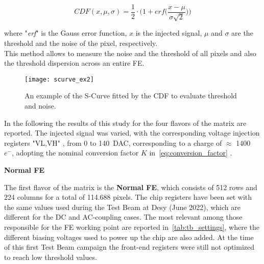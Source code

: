 \begin{equation}
 CDF(x,\mu,\sigma) = \frac{1}{2} \cdot \bigg(1 + \textit{erf}\bigg(\frac{x-\mu}{\sigma \sqrt{2}}\bigg)\bigg)
\label{eq:s-curve}
\end{equation}

where "\textit{erf}" is the Gauss error function, $x$ is the injected signal, $\mu$ and $\sigma$ are the threshold and the noise of the pixel, respectively.  \\

This method allows to measure the noise and the threshold of all pixels and also the threshold dispersion across an entire FE.

\begin{figure}
\centering
\texttt{[image: scurve\_ex2]}
\caption{An example of the S-Curve fitted by the CDF to evaluate threshold and noise.}
\label{fig:ex_scurve}
\end{figure}

In the following the results of this study for the four flavors of the matrix are reported. The injected signal was varied, with the corresponding voltage injection registers "VL,VH" , from 0 to \SI{140}{DAC}, corresponding to a charge of $\approx$ 1400~$e^{-}$, adopting the nominal conversion factor $K$ in~\autoref{eq:conversion_factor} .





\medskip
\begin{description}
\item \textbf{Normal FE}
\end{description}

The first flavor of the matrix is the \textbf{Normal FE}, which consists of 512 rows and 224 columns for a total of 114.688 pixels. The chip registers have been set with the same values used during the Test Beam at Desy (June 2022), which are different for the DC and AC-coupling cases. The most relevant among those responsible for the FE working point are reported in~\autoref{tab:tb_settings}, where the different biasing voltages used to power up the chip are also added. At the time of this first Test Beam campaign the front-end registers were still not  optimized to reach low threshold values. 

